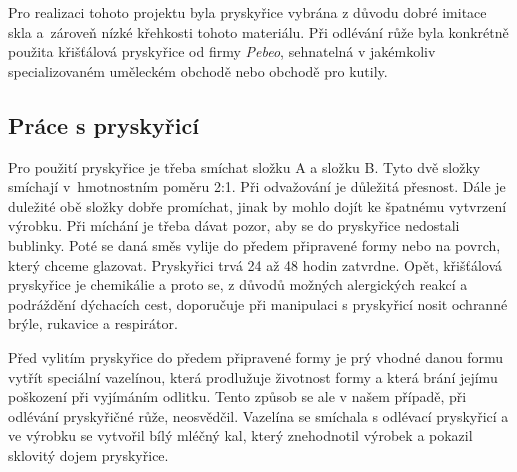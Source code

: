 Pro realizaci tohoto projektu byla pryskyřice vybrána z důvodu dobré imitace skla a~zároveň nízké křehkosti tohoto materiálu. 
Při odlévání růže byla konkrétně použita křišťálová pryskyřice od firmy \textit{Pebeo}\cite{pebeo}, sehnatelná v jakémkoliv specializovaném uměleckém obchodě nebo obchodě pro kutily. 


\subsection{Práce s pryskyřicí}

Pro použití pryskyřice je třeba smíchat složku A a složku B. Tyto dvě složky smíchají v~hmotnostním poměru 2:1. Při odvažování je důležitá přesnost. Dále je duležité obě složky dobře promíchat, jinak by mohlo dojít ke špatnému vytvrzení výrobku. Při míchání je třeba dávat pozor, aby se do pryskyřice nedostali bublinky. Poté se daná směs vylije do předem připravené formy nebo na povrch, který chceme glazovat. Pryskyřici trvá 24 až 48 hodin zatvrdne. Opět, křišťálová pryskyřice je chemikálie a proto se, z důvodů možných alergických reakcí a podráždění dýchacích cest, doporučuje při manipulaci s pryskyřicí nosit ochranné brýle, rukavice a respirátor. 

Před vylitím pryskyřice do předem připravené formy je prý vhodné danou formu vytřít speciální vazelínou, která prodlužuje životnost formy a která brání jejímu poškození při vyjímáním odlitku. Tento způsob se ale v našem případě, při odlévání pryskyřičné růže, neosvědčil. Vazelína se smíchala s odlévací pryskyřicí a ve výrobku se vytvořil bílý mléčný kal, který znehodnotil výrobek a pokazil sklovitý dojem pryskyřice.







